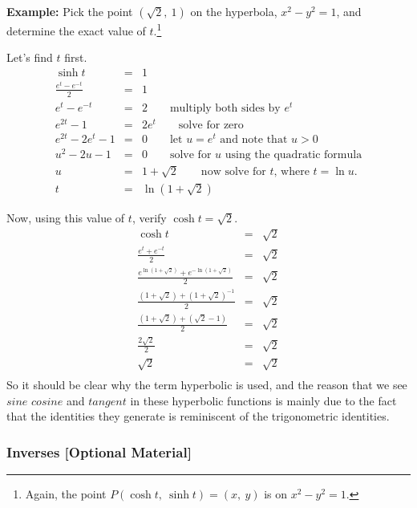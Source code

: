 \documentclass[12pt,addpoints, answers, fleqn]{exam}
\begin{document}
\textbf{Example:} Pick the point $\left( \sqrt{2}, \ 1 \right)$ on the hyperbola, $x^2-y^2=1$, and determine the exact value of $t$.\footnote{Again, the point $P\left( \cosh t, \ \sinh t \right) = \left( x, \ y \right)$ is on $x^2-y^2=1$.}


\begin{solution}
Let's find $t$ first.
\begin{eqnarray*}
\sinh t &=& 1\\
\frac{e^t - e^{-t}}{2} &=& 1\\
e^t - e^{-t} &=& 2 \qquad \mbox{multiply both sides by $e^t$}\\
e^{2t} - 1 &=& 2e^t \qquad \mbox{solve for zero}\\
e^{2t} - 2e^t - 1 &=& 0 \qquad \mbox{let $u=e^t$ and note that $u>0$}\\
u^2 - 2u - 1 &=& 0 \qquad \mbox{solve for $u$ using the quadratic formula}\\
u &=& 1 + \sqrt{2} \qquad \mbox{now solve for $t$, where $t= \ln u$.}\\
t &=& \ln \left( 1 + \sqrt{2} \right)
\end{eqnarray*}



Now, using this value of $t$, verify $\cosh t = \sqrt{2}$.
\begin{eqnarray*}
\cosh t &=& \sqrt{2}\\
\frac{e^t+e^{-t}}{2} &=& \sqrt{2}\\
\frac{e^{\ln \left( 1 + \sqrt{2} \right)}+e^{-\ln \left( 1 + \sqrt{2} \right)}}{2} &=& \sqrt{2}\\
\frac{\left( 1 + \sqrt{2} \right)+ \left( 1 + \sqrt{2} \right)^{-1}}{2} &=& \sqrt{2}\\
\frac{\left( 1 + \sqrt{2} \right)+ \left( \sqrt{2}-1 \right)}{2} &=& \sqrt{2}\\
\frac{2\sqrt{2}}{2} &=& \sqrt{2}\\
\sqrt{2} &=& \sqrt{2}\\
\end{eqnarray*}
So it should be clear why the term hyperbolic is used, and the reason that we see $sine$ $cosine$ and $tangent$ in these hyperbolic functions is mainly due to the fact that the identities they generate is reminiscent of the trigonometric identities.
\end{solution}

\subsubsection{Inverses [Optional Material]}
\end{document}
